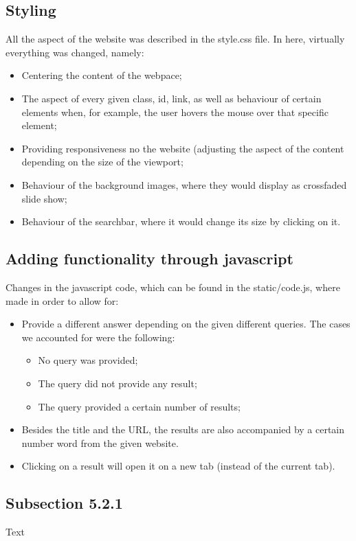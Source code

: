 \subsection{Styling}
All the aspect of the website was described in the style.css file. In here, virtually everything was changed, namely:
\begin{itemize}
    \item Centering the content of the webpace;
    \item The aspect of every given class, id, link, as well as behaviour of certain elements when, for example, the user hovers the mouse over that specific element;
    \item Providing responsiveness no the website (adjusting the aspect of the content depending on the size of the viewport;
    \item Behaviour of the background images, where they would display as crossfaded slide show;
    \item Behaviour of the searchbar, where it would change its size by clicking on it.
\end{itemize}

\subsection{Adding functionality through javascript}
Changes in the javascript code, which can be found in the static/code.js, where made in order to allow for:
\begin{itemize}
    \item Provide a different answer depending on the given different queries. The cases we accounted for were the following:
    \begin{itemize}
        \item No query was provided;
        \item The query did not provide any result;
        \item The query provided a certain number of results;
    \end{itemize}
    \item Besides the title and the URL, the results are also accompanied by a certain number word from the given website.
    \item Clicking on a result will open it on a new tab (instead of the current tab).
\end{itemize}


\subsection{Subsection 5.2.1}
Text\\
